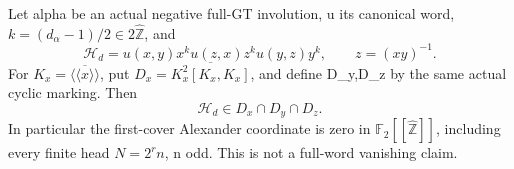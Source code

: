 Let alpha be an actual negative full-GT involution, u its canonical
word, \(k=(d_\alpha-1)/2\in2\widehat{\mathbb Z}\), and
\[
 \mathcal H_d=u(x,y)x^k u(z,x)z^k u(y,z)y^k,
 \qquad z=(xy)^{-1}.
 \tag{A.101.1}
\]
For \(K_x=\overline{\langle\!\langle x\rangle\!\rangle}\),
put \(D_x=\overline{K_x^2[K_x,K_x]}\), and define D_y,D_z
by the same actual cyclic marking. Then
\[
                 \mathcal H_d\in D_x\cap D_y\cap D_z.
 \tag{A.101.2}
\]
In particular the first-cover Alexander coordinate is zero in
\(\mathbb F_2[[\widehat{\mathbb Z}]]\), including every finite
head \(N=2^r n\), n odd. This is not a full-word vanishing claim.

